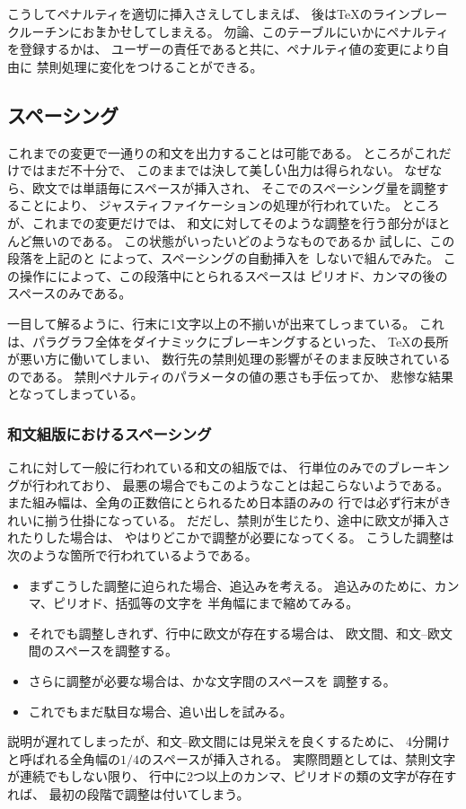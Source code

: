 こうしてペナルティを適切に挿入さえしてしまえば、
後は\TeX のラインブレークルーチンに\. お\. ま\. か\. せしてしまえる。
勿論、このテーブルにいかにペナルティを登録するかは、
ユーザーの責任であると共に、ペナルティ値の変更により自由に
禁則処理に変化をつけることができる。
%
\subsection{スペーシング}
{\noautospacing\noautoxspacing
これまでの変更で一通りの和文を出力することは可能である。
ところがこれだけではまだ不十分で、
このままでは決して\. 美\. し\. い出力は得られない。
なぜなら、欧文では単語毎にスペースが挿入され、
そこでのスペーシング量を調整することにより、
ジャスティファイケーションの処理が行われていた。
ところが、これまでの変更だけでは、
和文に対してそのような調整を行う部分がほとんど無いのである。
この状態がいったいどのようなものであるか
試しに、この段落を上記の{\it{}}と
{\it{}}によって、スペーシングの自動挿入を
しないで組んでみた。
この操作にによって、この段落中にとられるスペースは
ピリオド、カンマの後のスペースのみである。\par}

一目して解るように、行末に1文字以上の不揃いが出来てしっまている。
これは、パラグラフ全体をダイナミックにブレーキングするといった、
\TeX の長所が悪い方に働いてしまい、
数行先の禁則処理の影響がそのまま反映されているのである。
禁則ペナルティのパラメータの値の悪さも手伝ってか、
悲惨な結果となってしまっている。
%
\subsubsection{和文組版におけるスペーシング}
これに対して一般に行われている和文の組版では、
行単位のみでのブレーキングが行われており、
最悪の場合でもこのようなことは起こらないようである。
また組み幅は、全角の正数倍にとられるため日本語のみの
行では必ず行末がきれいに揃う仕掛になっている。
だだし、禁則が生じたり、途中に欧文が挿入されたりした場合は、
やはりどこかで調整が必要になってくる。
こうした調整は次のような箇所で行われているようである。
\begin{itemize}
\item まずこうした調整に迫られた場合、追込みを考える。
	追込みのために、カンマ、ピリオド、括弧等の文字を
	半角幅にまで縮めてみる。
\item それでも調整しきれず、行中に欧文が存在する場合は、
	欧文間、和文--欧文間のスペースを調整する。
\item さらに調整が必要な場合は、かな文字間のスペースを
	調整する。
\item これでもまだ駄目な場合、追い出しを試みる。
\end{itemize}
説明が遅れてしまったが、和文--欧文間には見栄えを良くするために、
4分開けと呼ばれる全角幅の$1/4$のスペースが挿入される。
実際問題としては、禁則文字が連続でもしない限り、
行中に2つ以上のカンマ、ピリオドの類の文字が存在すれば、
最初の段階で調整は付いてしまう。

